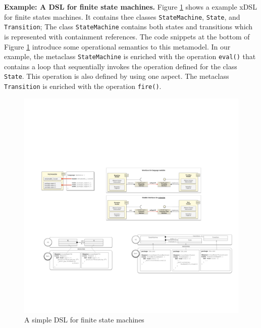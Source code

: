 \textbf{Example: A DSL for finite state machines.} %
Figure \ref{fig:k3-example} shows a example xDSL for finite states machines. It contains thee classes \texttt{StateMachine}, \texttt{State}, and \texttt{Transition}; The class \texttt{StateMachine} contains both states and transitions which is represented with containment references. The code snippets at the bottom of Figure \ref{fig:k3-example} introduce some operational semantics to this metamodel\cite{Combemale:2013}. %
In our example, the metaclass \texttt{StateMachine} is enriched with the operation \texttt{eval()} that contains a loop that sequentially invokes the operation defined for the class \texttt{State}. This operation is also defined by using one aspect. The metaclass \texttt{Transition} is enriched with the operation \texttt{fire()}.

\begin{figure}
\centering
\includegraphics[width=1\linewidth]{images/k3-example-fig}
\caption{A simple DSL for finite state machines}
\label{fig:k3-example}
\end{figure}

